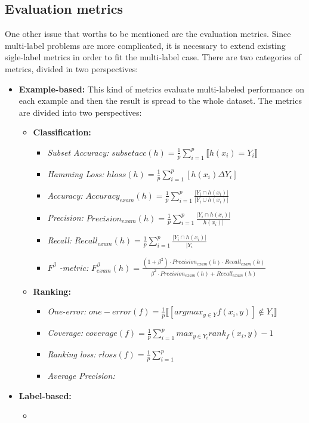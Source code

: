 \documentclass[12pt]{report}
\begin{document}
	\subsection*{Evaluation metrics}
	One other issue that worths to be mentioned are the evaluation metrics. Since multi-label problems are more complicated, it is necessary to extend existing sigle-label metrics in order to fit the multi-label case. There are two categories of metrics, divided in two perspectives:
	\begin{itemize}
		\item \textbf{Example-based: }This kind of metrics evaluate multi-labeled performance on each example and then the result is spread to the whole dataset. The metrics are divided into two perspectives:
		\begin{itemize}
			\item \textbf{Classification:} 
			\begin{itemize}
				\item \emph{Subset Accuracy: } $subsetacc(h) = \frac{1}{p} \sum_{i=1}^p \llbracket h(x_i) = Y_i \rrbracket$
				\item \emph{Hamming Loss: }$hloss(h) = \frac{1}{p} \sum_{i=1}^{p} [h(x_i)\Delta Y_i] $
				\item \emph{Accuracy:} $Accuracy_{exam}(h) = \frac{1}{p} \sum_{i=1}^{p} \frac{|Y_i \cap h(x_i)|}{|Y_i \cup h(x_i)|}$
				\item \emph{Precision: }$Precision_{exam}(h) = \frac{1}{p} \sum_{i=1}^{p} \frac{|Y_i \cap h(x_i)|}{h(x_i)|}$
				\item \emph{Recall: }$Recall_{exam}(h) = \frac{1}{p} \sum_{i=1}^{p} \frac{|Y_i \cap h(x_i)|}{|Y_i}$
				\item \emph{$F^ \beta$ -metric: } $F^ \beta _{exam} (h) = \frac{(1+ \beta ^2) \cdot Precision_{exam}(h) \cdot Recall_{exam}(h)}{\beta ^2 \cdot Precision_{exam}(h) + Recall_{exam}(h)}$
			\end{itemize}
			\item \textbf{Ranking:}
			\begin{itemize}
				\item \emph{One-error: }$one-error(f) = \frac{1}{p} \llbracket [argmax_{y \in Y}f(x_i,y)] \notin Y_i \rrbracket$
				\item \emph{Coverage: } $coverage(f) = \frac{1}{p} \sum_{i=1}^{p} max_{y \in Y_i} rank_f(x_i,y) - 1$
				\item \emph{Ranking loss: }$rloss(f) = \frac{1}{p} \sum_{i=1}^{p} $ 
				\item \emph{Average Precision: } 
			\end{itemize}
		\end{itemize}
		\item \textbf{Label-based: }
		\begin{itemize}
			\item {}
		\end{itemize}
	\end{itemize}
\end{document}
